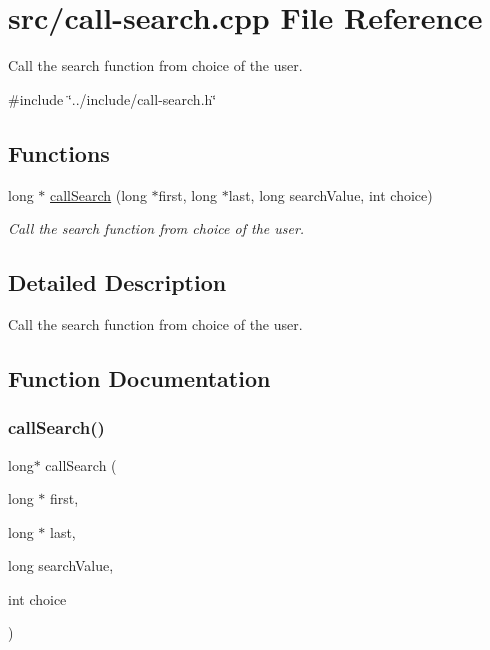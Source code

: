 \hypertarget{call-search_8cpp}{}\section{src/call-\/search.cpp File Reference}
\label{call-search_8cpp}


Call the search function from choice of the user.  


{\ttfamily \#include \char`\"{}../include/call-\/search.\+h\char`\"{}}\newline
\subsection*{Functions}
\begin{DoxyCompactItemize}
\item 
long $\ast$ \mbox{\hyperlink{call-search_8cpp_aa4c0ed6a64776cb3d018dff7a5077c4b}{call\+Search}} (long $\ast$first, long $\ast$last, long search\+Value, int choice)
\begin{DoxyCompactList}\small\item\em Call the search function from choice of the user. \end{DoxyCompactList}\end{DoxyCompactItemize}


\subsection{Detailed Description}
Call the search function from choice of the user. 



\subsection{Function Documentation}
\mbox{\label{call-search_8cpp_aa4c0ed6a64776cb3d018dff7a5077c4b}} 
\subsubsection{\texorpdfstring{callSearch()}{callSearch()}}
{\footnotesize\ttfamily long$\ast$ call\+Search (\begin{DoxyParamCaption}\item[{long $\ast$}]{first,  }\item[{long $\ast$}]{last,  }\item[{long}]{search\+Value,  }\item[{int}]{choice }\end{DoxyParamCaption})}




